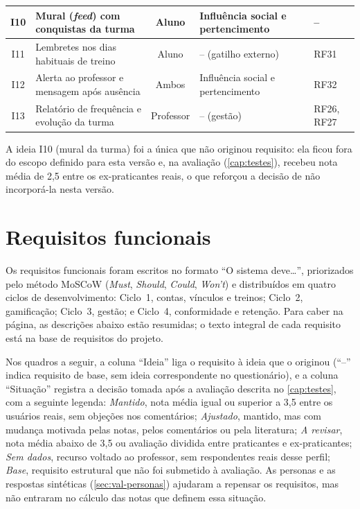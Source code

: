 \begin{quadrolongo}
\begin{longtable}{|c|p{4.6cm}|c|p{3.9cm}|p{2.0cm}|}
    I10 & Mural (\textit{feed}) com conquistas da turma & Aluno & Influência social e pertencimento & -- \\ \hline
    I11 & Lembretes nos dias habituais de treino & Aluno & -- (gatilho externo) & RF31 \\ \hline
    I12 & Alerta ao professor e mensagem após ausência & Ambos & Influência social e pertencimento & RF32 \\ \hline
    I13 & Relatório de frequência e evolução da turma & Professor & -- (gestão) & RF26, RF27 \\ \hline
\end{longtable}
\end{quadrolongo}

A ideia I10 (mural da turma) foi a única que não originou requisito: ela
ficou fora do escopo definido para esta versão e, na avaliação
(\autoref{cap:testes}), recebeu nota média de 2,5 entre os
ex-praticantes reais, o que reforçou a decisão de não incorporá-la nesta
versão.

\section{Requisitos funcionais}
\label{sec:rf}

Os requisitos funcionais foram escritos no formato ``O sistema deve\ldots'',
priorizados pelo método MoSCoW (\textit{Must}, \textit{Should},
\textit{Could}, \textit{Won't}) e distribuídos em quatro ciclos de
desenvolvimento: Ciclo~1, contas, vínculos e treinos; Ciclo~2,
gamificação; Ciclo~3, gestão; e Ciclo~4, conformidade e retenção. Para
caber na página, as descrições abaixo estão resumidas; o texto integral de
cada requisito está na base de requisitos do projeto.

Nos quadros a seguir, a coluna ``Ideia'' liga o requisito à ideia que o
originou (``--'' indica requisito de base, sem ideia correspondente no
questionário), e a coluna ``Situação'' registra a decisão tomada após a
avaliação descrita no \autoref{cap:testes}, com a seguinte legenda:
\textit{Mantido}, nota média igual ou superior a 3,5 entre os usuários
reais, sem objeções nos comentários; \textit{Ajustado}, mantido, mas com
mudança motivada pelas notas, pelos comentários ou pela literatura;
\textit{A revisar}, nota média abaixo de 3,5 ou avaliação dividida entre
praticantes e ex-praticantes; \textit{Sem dados}, recurso voltado ao
professor, sem respondentes reais desse perfil; \textit{Base}, requisito
estrutural que não foi submetido à avaliação. As personas e as respostas
sintéticas (\autoref{sec:val-personas}) ajudaram a repensar os
requisitos, mas não entraram no cálculo das notas que definem essa
situação.


